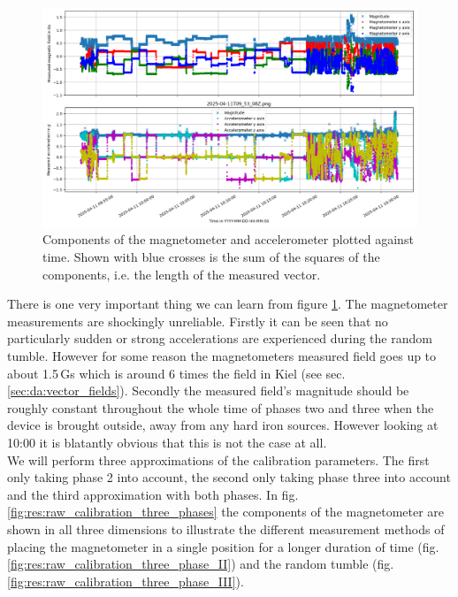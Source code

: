 \begin{figure}[H]
    \centering
    \includegraphics[width=\linewidth]{images/04_results/raw_vectors-2025-04-11.png}
    \caption[Components of the magnetometer and accelerometer plotted against time.]{Components of the magnetometer and accelerometer plotted against time. Shown with blue crosses is the sum of the squares of the components, i.e. the length of the measured vector.}
    \label{fig:res:raw_cali_vectors}
\end{figure}

There is one very important thing we can learn from figure \ref{fig:res:raw_cali_vectors}. The magnetometer measurements are shockingly unreliable. Firstly it can be seen that no particularly sudden or strong accelerations are experienced during the random tumble. However for some reason the magnetometers measured field goes up to about 1.5\,Gs which is around 6 times the field in Kiel (see sec. \ref{sec:da:vector_fields}). Secondly the measured field's magnitude should be roughly constant throughout the whole time of phases two and three when the device is brought outside, away from any hard iron sources. However looking at 10:00 it is blatantly obvious that this is not the case at all.\\
We will perform three approximations of the calibration parameters. The first only taking phase 2 into account, the second only taking phase three into account and the third approximation with both phases. In fig. \ref{fig:res:raw_calibration_three_phases} the components of the magnetometer are shown in all three dimensions to illustrate the different measurement methods of placing the magnetometer in a single position for a longer duration of time (fig. \ref{fig:res:raw_calibration_three_phase_II}) and the random tumble (fig. \ref{fig:res:raw_calibration_three_phase_III}).

